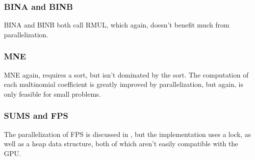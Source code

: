 \subsubsection{BINA and BINB}
BINA and BINB both call RMUL, which again, doesn't benefit much from parallelization.

\subsubsection{MNE}
MNE again, requires a sort, but isn't dominated by the sort. The computation of each multinomial coefficient is greatly improved by parallelization, but again, is only feasible for small problems.



\subsubsection{SUMS and FPS}
The parallelization of FPS is discussed in \cite{monagan-2012-sparse-powering}, but the implementation uses a lock, as well as a heap data structure, both of which aren't easily compatible with the GPU.